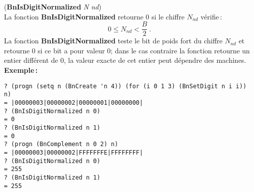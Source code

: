 \vspace*{24pt}
({\bf BnIsDigitNormalized} {\em N nd})
\\[12pt]
La fonction {\bf BnIsDigitNormalized} retourne 0 si le chiffre $N_{nd}$
v\'erifie\,:
\[ 0 \leq N_{nd} < \frac{B}{2}\ .\]
La fonction {\bf BnIsDigitNormalized} teste le bit de poids fort du chiffre
$N_{nd}$ et retourne 0 si ce bit a pour valeur 0; dans le cas contraire
la fonction retourne un entier diff\'erent de 0, la valeur exacte de cet
entier peut d\'ependre des machines.
\\[18pt]
{\bf Exemple\,:}
\begin{verbatim}
? (progn (setq n (BnCreate 'n 4)) (for (i 0 1 3) (BnSetDigit n i i)) n)
= |00000003|00000002|00000001|00000000|
? (BnIsDigitNormalized n 0)
= 0
? (BnIsDigitNormalized n 1)
= 0
? (progn (BnComplement n 0 2) n)
= |00000003|00000002|FFFFFFFE|FFFFFFFF|
? (BnIsDigitNormalized n 0)
= 255
? (BnIsDigitNormalized n 1)
= 255
\end{verbatim}
\vspace*{15pt}

